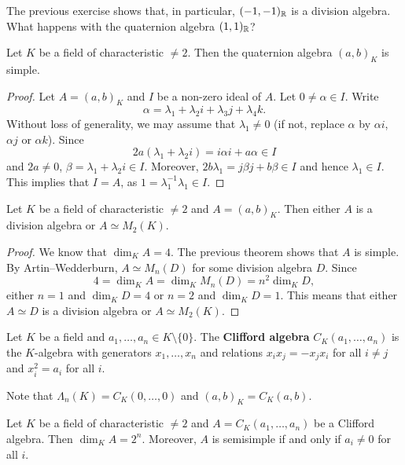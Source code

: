 The previous exercise shows that, in particular, $(-1,-1)_{\mathbb{R}}$ is a division algebra. 
What happens with the quaternion algebra $(1,1)_{\mathbb{R}}$?

\begin{theorem}
    Let $K$ be a field of characteristic $\ne2$. Then the quaternion algebra
    $(a,b)_K$ is simple. 
\end{theorem}

\begin{proof}
    Let $A=(a,b)_K$ and $I$ be a non-zero ideal of $A$. Let $0\ne\alpha\in I$. 
    Write 
    \[
    \alpha=\lambda_1+\lambda_2i+\lambda_3j+\lambda_4k.
    \]
    Without loss of generality, 
    we may assume that $\lambda_1\ne 0$ (if not, replace $\alpha$ by $\alpha i$, $\alpha j$ or 
    $\alpha k$). Since 
    \[
    2a(\lambda_1+\lambda_2 i)=i\alpha i+a\alpha\in I
    \]
    and $2a\ne 0$, $\beta=\lambda_1+\lambda_2 i\in I$. Moreover, 
    $2b\lambda_1=j\beta j+b\beta\in I$ and hence $\lambda_1\in I$. This implies
    that $I=A$, as $1=\lambda_1^{-1}\lambda_1\in I$. 
\end{proof}

\begin{corollary}
    Let $K$ be a field of characteristic $\ne2$ and $A=(a,b)_K$. 
    Then either $A$ is a division algebra or $A\simeq M_2(K)$. 
\end{corollary}

\begin{proof}
    We know that $\dim_KA=4$. The previous theorem shows that 
    $A$ is simple. By Artin--Wedderburn, $A\simeq M_n(D)$ for some 
    division algebra $D$. Since 
    \[
    4=\dim_KA=\dim_KM_n(D)=n^2\dim_KD,
    \]
    either $n=1$ and $\dim_KD=4$ or $n=2$ and $\dim_KD=1$. This means
    that either $A\simeq D$ is a division algebra or $A\simeq M_2(K)$. 
\end{proof}


\begin{definition}
    Let $K$ be a field and $a_1,\dots,a_n\in K\setminus\{0\}$. 
    The \textbf{Clifford algebra} $C_K(a_1,\dots,a_n)$ 
    is the $K$-algebra with generators $x_1,\dots,x_n$ and relations
    $x_ix_j=-x_jx_i$ for all $i\ne j$ and $x_i^2=a_i$ for all $i$. 
\end{definition}

Note that $\Lambda_n(K)=C_K(0,\dots,0)$ and 
$(a,b)_K=C_K(a,b)$. 

\begin{theorem}
    Let $K$ be a field of characteristic $\ne2$ and 
    $A=C_K(a_1,\dots,a_n)$ be a Clifford algebra. 
    Then $\dim_KA=2^n$. Moreover, $A$ is semisimple if and only if $a_i\ne0$ for all $i$. 
\end{theorem}

